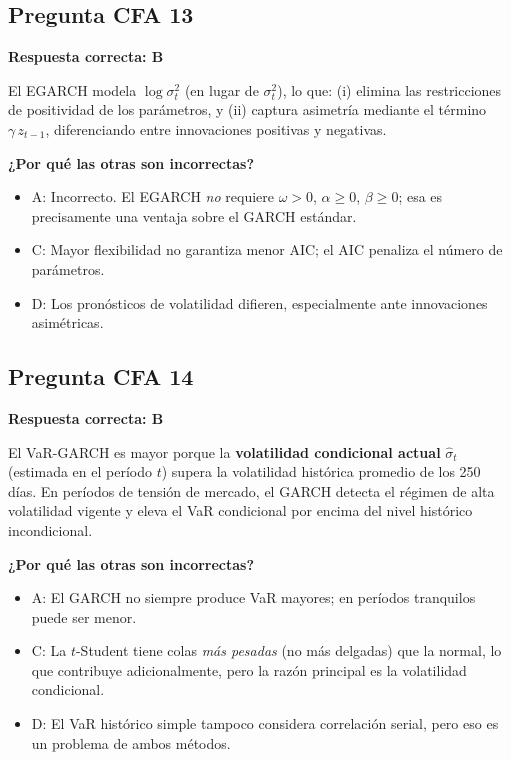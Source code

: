 \documentclass[12pt,a4paper]{article}
\begin{document}
\subsection*{Pregunta CFA 13}

\begin{respuestacfa}
\textbf{Respuesta correcta: B}

El EGARCH modela $\log\sigma_t^2$ (en lugar de $\sigma_t^2$), lo que: (i) elimina las restricciones de positividad de los parámetros, y (ii) captura asimetría mediante el término $\gamma\,z_{t-1}$, diferenciando entre innovaciones positivas y negativas.

\textbf{¿Por qué las otras son incorrectas?}
\begin{itemize}[noitemsep]
  \item A: Incorrecto. El EGARCH \emph{no} requiere $\omega>0$, $\alpha\geq0$, $\beta\geq0$; esa es precisamente una ventaja sobre el GARCH estándar.
  \item C: Mayor flexibilidad no garantiza menor AIC; el AIC penaliza el número de parámetros.
  \item D: Los pronósticos de volatilidad difieren, especialmente ante innovaciones asimétricas.
\end{itemize}
\end{respuestacfa}

\subsection*{Pregunta CFA 14}

\begin{respuestacfa}
\textbf{Respuesta correcta: B}

El VaR-GARCH es mayor porque la \textbf{volatilidad condicional actual} $\hat{\sigma}_t$ (estimada en el período $t$) supera la volatilidad histórica promedio de los 250 días. En períodos de tensión de mercado, el GARCH detecta el régimen de alta volatilidad vigente y eleva el VaR condicional por encima del nivel histórico incondicional.

\textbf{¿Por qué las otras son incorrectas?}
\begin{itemize}[noitemsep]
  \item A: El GARCH no siempre produce VaR mayores; en períodos tranquilos puede ser menor.
  \item C: La $t$-Student tiene colas \emph{más pesadas} (no más delgadas) que la normal, lo que contribuye adicionalmente, pero la razón principal es la volatilidad condicional.
  \item D: El VaR histórico simple tampoco considera correlación serial, pero eso es un problema de ambos métodos.
\end{itemize}
\end{respuestacfa}
\end{document}
